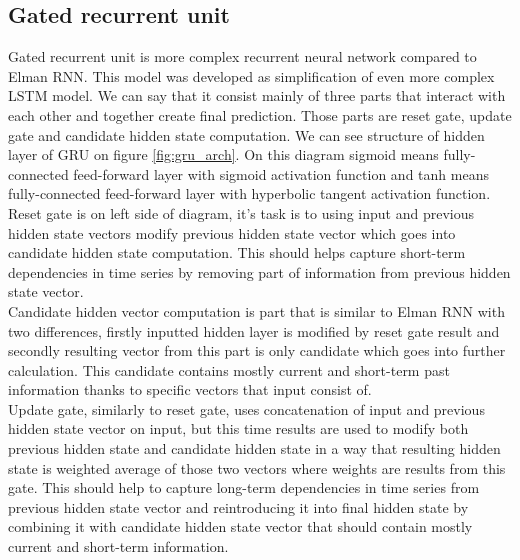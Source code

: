 \subsection{Gated recurrent unit}
 
Gated recurrent unit is more complex recurrent neural network compared to Elman RNN. This model was developed as simplification of even more complex LSTM model. We can say that it consist mainly of three parts that interact with each other and together create final prediction. Those parts are reset gate, update gate and candidate hidden state computation. We can see structure of hidden layer of GRU on figure \ref{fig:gru_arch}. On this diagram sigmoid means fully-connected feed-forward layer with sigmoid activation function and tanh means fully-connected feed-forward layer with hyperbolic tangent activation function.
\\

Reset gate is on left side of diagram, it's task is to using input and previous hidden state vectors modify previous hidden state vector which goes into candidate hidden state computation. This should helps capture short-term dependencies in time series by removing part of information from previous hidden state vector.
\\

Candidate hidden vector computation is part that is similar to Elman RNN with two differences, firstly inputted hidden layer is modified by reset gate result and secondly resulting vector from this part is only candidate which goes into further calculation. This candidate contains mostly current and short-term past information thanks to specific vectors that input consist of. 
\\

Update gate, similarly to reset gate, uses concatenation of input and previous hidden state vector on input, but this time results are used to modify both previous hidden state and candidate hidden state in a way that resulting hidden state is weighted average of those two vectors where weights are results from this gate. This should help to capture long-term dependencies in time series from previous hidden state vector and reintroducing it into final hidden state by combining it with candidate hidden state vector that should contain mostly current and short-term information. 
\\ 

